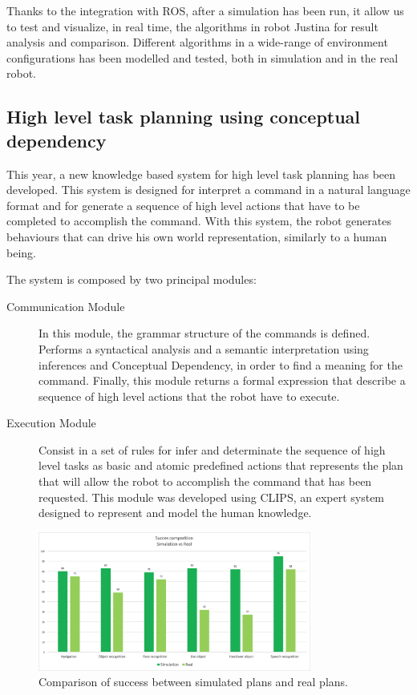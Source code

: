 \documentclass{llncs}
\begin{document}
Thanks to the integration with ROS, after a simulation has been run, it allow us to test and visualize, in real time, the algorithms in robot Justina for result analysis and comparison. Different algorithms in a wide-range of environment configurations has been modelled and tested, both in simulation and in the real robot. 

\subsection{High level task planning using conceptual dependency}\label{subsec:ActionPln}
This year, a new knowledge based system for high level task planning has been developed. This system is designed for interpret a command in a natural language format and for generate a sequence of high level  actions that have to be completed to accomplish the command. With this system, the robot generates behaviours that can drive his own world representation, similarly to a human being. 

The system is composed by two principal modules:
\begin{description}
\item[Communication Module] In this module, the grammar structure of the commands is defined. Performs a syntactical analysis and a semantic interpretation using inferences and Conceptual Dependency, in order to find a meaning for the command. Finally, this module returns a formal expression that describe a sequence of high level actions that the robot have to execute. 
\item[Execution Module] Consist in a set of rules for infer and determinate the sequence of high level tasks as  basic and atomic predefined actions that represents the plan that will allow the robot to accomplish the command that has been requested. This module was developed using CLIPS, an expert system designed to represent and model the human knowledge.
\end{description}

\begin{figure}[H]
	\centering
	\includegraphics[width=0.8\textwidth]{Figures/taskPlanning.png}
	\caption{Comparison of success between simulated plans and real plans.}
	\label{fig:taskPlanning}
\end{figure}
\end{document}
